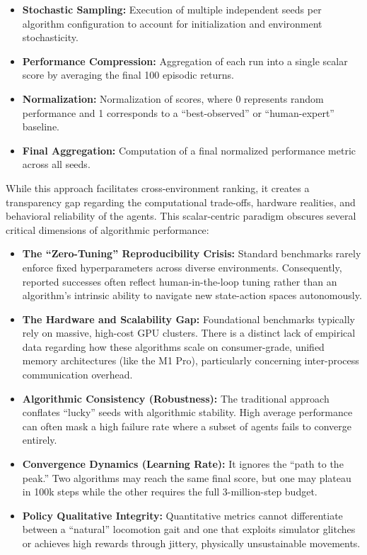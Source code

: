 \begin{itemize}
    \item \textbf{Stochastic Sampling:} Execution of multiple independent seeds per algorithm configuration to account for initialization and environment stochasticity.

    \item \textbf{Performance Compression:} Aggregation of each run into a single scalar score by averaging the final 100 episodic returns.

    \item \textbf{Normalization:} Normalization of scores, where 0 represents random performance and 1 corresponds to a ``best-observed'' or ``human-expert'' baseline.

    \item \textbf{Final Aggregation:} Computation of a final normalized performance metric across all seeds.
\end{itemize}

While this approach facilitates cross-environment ranking, it creates a transparency gap regarding the computational trade-offs, hardware realities, and behavioral reliability of the agents. This scalar-centric paradigm obscures several critical dimensions of algorithmic performance:

\begin{itemize}
    \item \textbf{The ``Zero-Tuning'' Reproducibility Crisis:} Standard benchmarks rarely enforce fixed hyperparameters across diverse environments. Consequently, reported successes often reflect human-in-the-loop tuning rather than an algorithm's intrinsic ability to navigate new state-action spaces autonomously.

    \item \textbf{The Hardware and Scalability Gap:} Foundational benchmarks typically rely on massive, high-cost GPU clusters. There is a distinct lack of empirical data regarding how these algorithms scale on consumer-grade, unified memory architectures (like the M1 Pro), particularly concerning inter-process communication overhead.

    \item \textbf{Algorithmic Consistency (Robustness):} The traditional approach conflates ``lucky'' seeds with algorithmic stability. High average performance can often mask a high failure rate where a subset of agents fails to converge entirely.

    \item \textbf{Convergence Dynamics (Learning Rate):} It ignores the ``path to the peak.'' Two algorithms may reach the same final score, but one may plateau in 100k steps while the other requires the full 3-million-step budget.

    \item \textbf{Policy Qualitative Integrity:} Quantitative metrics cannot differentiate between a ``natural'' locomotion gait and one that exploits simulator glitches or achieves high rewards through jittery, physically unsustainable movements.
\end{itemize}

